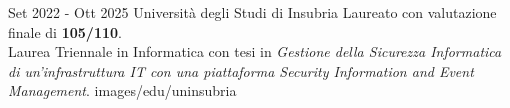 {Set 2022 - Ott 2025}
{Università degli Studi di Insubria}
{Laureato con valutazione finale di \textbf{105/110}.\\
Laurea Triennale in Informatica con 
tesi in 
\textit{Gestione della 
Sicurezza Informatica di 
un'infrastruttura IT 
con una piattaforma 
Security Information and 
Event Management}.}
{images/edu/uninsubria}
